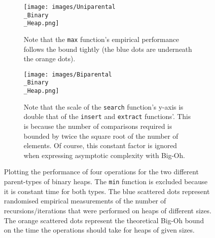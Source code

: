 \documentclass{article}
\begin{document}
\begin{figure}
     \centering
     \begin{subfigure}[b]{0.8\textwidth}
         \centering
         \texttt{[image: images/Uniparental\\\_Binary\\\_Heap.png]}
         \caption{Note that the \texttt{max} function's empirical performance follows the bound tightly (the blue dots are underneath the orange dots).}
         \label{fig:uniparental}
     \end{subfigure}
     \hfill
     \begin{subfigure}[b]{0.8\textwidth}
         \centering
         \texttt{[image: images/Biparental\\\_Binary\\\_Heap.png]}
         \caption{Note that the scale of the \texttt{search} function's y-axis is double that of the \texttt{insert} and \texttt{extract} functions'. This is because the number of comparisons required is bounded by twice the square root of the number of elements. Of course, this constant factor is ignored when expressing asymptotic complexity with Big-Oh.}
         \label{fig:biparental}
     \end{subfigure}
     \hfill
        \caption{Plotting the performance of four operations for the two different parent-types of binary heaps. The \texttt{min} function is excluded because it is constant time for both types. The blue scattered dots represent randomised empirical measurements of the number of recursions/iterations that were performed on heaps of different sizes. The orange scattered dots represent the theoretical Big-Oh bound on the time the operations should take for heaps of given sizes.}
        \label{fig:performance}
\end{figure}
\end{document}
